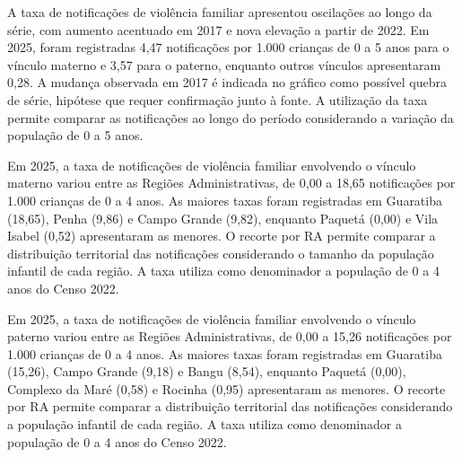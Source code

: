 
A taxa de notificações de violência familiar apresentou oscilações ao longo da série, com aumento acentuado em 2017 e nova elevação a partir de 2022. Em 2025, foram registradas 4,47 notificações por 1.000 crianças de 0 a 5 anos para o vínculo materno e 3,57 para o paterno, enquanto outros vínculos apresentaram 0,28. A mudança observada em 2017 é indicada no gráfico como possível quebra de série, hipótese que requer confirmação junto à fonte. A utilização da taxa permite comparar as notificações ao longo do período considerando a variação da população de 0 a 5 anos.


Em 2025, a taxa de notificações de violência familiar envolvendo o vínculo materno variou entre as Regiões Administrativas, de 0,00 a 18,65 notificações por 1.000 crianças de 0 a 4 anos. As maiores taxas foram registradas em Guaratiba (18,65), Penha (9,86) e Campo Grande (9,82), enquanto Paquetá (0,00) e Vila Isabel (0,52) apresentaram as menores. O recorte por RA permite comparar a distribuição territorial das notificações considerando o tamanho da população infantil de cada região. A taxa utiliza como denominador a população de 0 a 4 anos do Censo 2022.


Em 2025, a taxa de notificações de violência familiar envolvendo o vínculo paterno variou entre as Regiões Administrativas, de 0,00 a 15,26 notificações por 1.000 crianças de 0 a 4 anos. As maiores taxas foram registradas em Guaratiba (15,26), Campo Grande (9,18) e Bangu (8,54), enquanto Paquetá (0,00), Complexo da Maré (0,58) e Rocinha (0,95) apresentaram as menores. O recorte por RA permite comparar a distribuição territorial das notificações considerando a população infantil de cada região. A taxa utiliza como denominador a população de 0 a 4 anos do Censo 2022.

